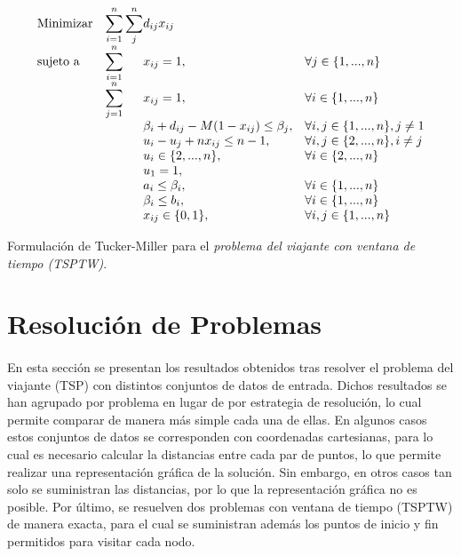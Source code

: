 \documentclass[spanish]{article}
\begin{document}
		\begin{eqfloat}
			\begin{equation}
				\begin{array}{ll@{}ll}
					\text{Minimizar}	& \displaystyle\sum\limits_{i = 1}^{n}\sum\limits_{j}^{n} & d_{ij}x_{ij} &\\
					\text{sujeto a}		& \displaystyle\sum\limits_{i = 1}^{n}	&	x_{ij} 	= 1,  & \forall j \in \{1,...,n\} \\
														& \displaystyle\sum\limits_{j = 1}^{n}	&	x_{ij} 	= 1,  & \forall i \in \{1,...,n\} \\
														& 				&	\beta_{i} + d_{ij} - M(1-x_{ij}) \leq \beta_{j},  & \forall i, j \in \{1,...,n\}, j \neq 1 \\
														& 				&	u_i - u_j + n x_{ij}	\leq n-1,  & \forall i, j \in \{2,...,n\}, i \neq j \\
														&                               &	u_{i} \in \{2,...,n\}, 		& \forall i \in \{2,...,n\} \\
														&                               &	u_{1}  = 1, 	& \\
														&                               &	a_{i} \leq \beta_{i}, 		& \forall i \in \{1,...,n\} \\
														&                               &	\beta_{i} \leq b_{i}, 		& \forall i \in \{1,...,n\} \\
														&                               &	x_{ij} \in \{0,1\}, 	& \forall i,j \in \{1,...,n\}
				\end{array}
			\end{equation}
			\caption{Formulación de Tucker-Miller para el \emph{problema del viajante con ventana de tiempo (TSPTW)}.}
			\label{eq:tsptw_tm}
		\end{eqfloat}

	\section{Resolución de Problemas}

		\paragraph{}
		En esta sección se presentan los resultados obtenidos tras resolver el problema del viajante (TSP) con distintos conjuntos de datos de entrada. Dichos resultados se han agrupado por problema en lugar de por estrategia de resolución, lo cual permite comparar de manera más simple cada una de ellas. En algunos casos estos conjuntos de datos se corresponden con coordenadas cartesianas, para lo cual es necesario calcular la distancias entre cada par de puntos, lo que permite realizar una representación gráfica de la solución. Sin embargo, en otros casos tan solo se suministran las distancias, por lo que la representación gráfica no es posible. Por último, se resuelven dos problemas con ventana de tiempo (TSPTW) de manera exacta, para el cual se suministran además los puntos de inicio y fin permitidos para visitar cada nodo.
\end{document}
